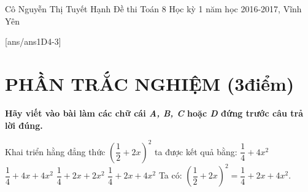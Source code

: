 \begin{name}
{Cô Nguyễn Thị Tuyết Hạnh}
{Đề thi Toán 8 Học kỳ 1 năm học 2016-2017, Vĩnh Yên}
\end{name}
	[ans/ans1D4-3]
	\section{PHẦN TRẮC NGHIỆM (3điểm)}
	\textbf{Hãy viết vào bài làm các chữ cái \textit{A, B, C} hoặc \textit{D} đứng trước câu trả lời đúng.}
\begin{ex}%
	Khai triển hằng đẳng thức
 $\left(\dfrac{1}{2}+2x\right)^2$ ta được kết quả bằng:
	\choice
	{$\dfrac{1}{4}+4x^2$}
	{$\dfrac{1}{4}+4x+4x^2$}
	{\True $\dfrac{1}{4}+2x+2x^2$}
	{$\dfrac{1}{4}+2x+4x^2$}
\loigiai
   {
   Ta có: $\left(\dfrac{1}{2}+2x\right)^2=\dfrac{1}{4}+2x+4x^2.$
}
\end{ex}

